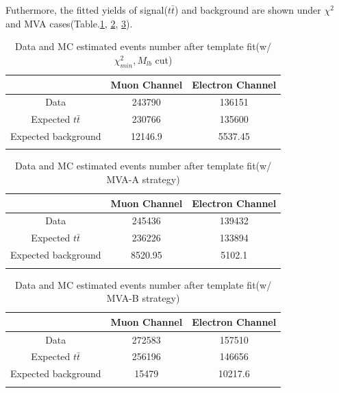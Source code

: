 		\FloatBarrier

		Futhermore, the fitted yields of signal($t\bar{t}$) and background are shown under $\chi^2$ and MVA cases(Table.\ref{BkgEst:tb:DataMC_est_chi2}, \ref{BkgEst:tb:DataMC_est_MVAA}, \ref{BkgEst:tb:DataMC_est_MVAB}).

		\begin{center}
		\begin{longtable}[H]{ c c c }
		\caption{Data and MC estimated events number after template fit(w/ $\chi^2_{min}, M_{lb}$ cut)} \\
		\hline
		 & Muon Channel & Electron Channel \\ 
		\hline
		 Data & 243790 & 136151 \\
		\hline
		 Expected $t\bar{t}$ & 230766 & 135600 \\
		 Expected background & 12146.9 & 5537.45 \\
		\hline
		\label{BkgEst:tb:DataMC_est_chi2}
		\end{longtable}
		\end{center}
		\FloatBarrier

		\begin{center}
		\begin{longtable}[H]{ c c c }
		\caption{Data and MC estimated events number after template fit(w/ MVA-A strategy)} \\
		\hline
		 & Muon Channel & Electron Channel \\ 
		\hline
		 Data & 245436 & 139432 \\
		\hline
		 Expected $t\bar{t}$ & 236226 & 133894  \\
		 Expected background & 8520.95 & 5102.1 \\
		\hline
		\label{BkgEst:tb:DataMC_est_MVAA}
		\end{longtable}
		\end{center}
		\FloatBarrier

		\begin{center}
		\begin{longtable}[H]{ c c c }
		\caption{Data and MC estimated events number after template fit(w/ MVA-B strategy)} \\
		\hline
		 & Muon Channel & Electron Channel \\ 
		\hline
		 Data & 272583 & 157510 \\
		\hline
		 Expected $t\bar{t}$ & 256196 & 146656 \\
		 Expected background & 15479 & 10217.6 \\
		\hline
		\label{BkgEst:tb:DataMC_est_MVAB}
		\end{longtable}
		\end{center}
		\FloatBarrier

